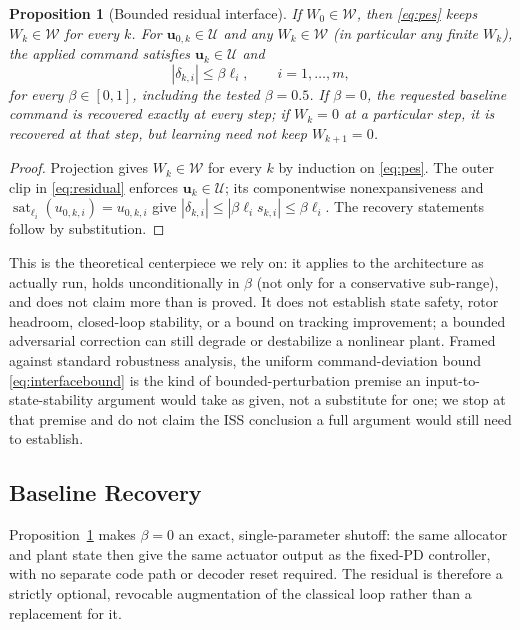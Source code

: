 \documentclass[letterpaper, 10 pt, conference]{ieeeconf}
\newcommand{\sat}{\operatorname{sat}}
\newtheorem{proposition}{Proposition}
\begin{document}
\begin{proposition}[Bounded residual interface]\label{prop:interface}
If $W_0\in\mathcal W$, then \eqref{eq:pes} keeps $W_k\in\mathcal W$ for
every $k$. For $\bm u_{0,k}\in\mathcal U$ and any $W_k\in\mathcal W$
(in particular any finite $W_k$), the applied command satisfies
$\bm u_k\in\mathcal U$ and
\begin{equation}
 |\delta_{k,i}|\le\beta\ell_i,\qquad i=1,\dots,m,
 \label{eq:interfacebound}
\end{equation}
for every $\beta\in[0,1]$, including the tested $\beta=0.5$. If $\beta=0$,
the requested baseline command is recovered exactly at every step; if
$W_k=0$ at a particular step, it is recovered at that step, but learning
need not keep $W_{k+1}=0$.
\end{proposition}
\begin{proof}
Projection gives $W_k\in\mathcal W$ for every $k$ by induction on
\eqref{eq:pes}. The outer clip in \eqref{eq:residual} enforces
$\bm u_k\in\mathcal U$; its componentwise nonexpansiveness and
$\sat_{\ell_i}(u_{0,k,i})=u_{0,k,i}$ give
$|\delta_{k,i}|\le|\beta\ell_i s_{k,i}|\le\beta\ell_i$. The recovery
statements follow by substitution.
\end{proof}
This is the theoretical centerpiece we rely on: it applies to the
architecture as actually run, holds unconditionally in $\beta$ (not only
for a conservative sub-range), and does not claim more than is proved. It
does not establish state safety, rotor headroom, closed-loop stability, or
a bound on tracking improvement; a bounded adversarial correction can
still degrade or destabilize a nonlinear plant. Framed against standard
robustness analysis, the uniform command-deviation bound
\eqref{eq:interfacebound} is the kind of bounded-perturbation premise an
input-to-state-stability argument would take as given, not a substitute
for one; we stop at that premise and do not claim the ISS conclusion a
full argument would still need to establish.

\subsection{Baseline Recovery}
Proposition~\ref{prop:interface} makes $\beta=0$ an exact, single-parameter
shutoff: the same allocator and plant state then give the same actuator
output as the fixed-PD controller, with no separate code path or decoder
reset required. The residual is therefore a strictly optional, revocable
augmentation of the classical loop rather than a replacement for it.
\end{document}
